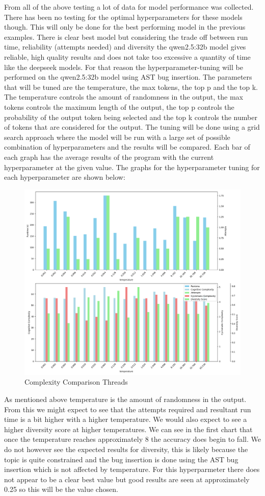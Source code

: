 \documentclass[12pt]{extarticle}
\begin{document}
From all of the above testing a lot of data for model performance was collected. There has been no testing for the optimal hyperparameters for these models though. This will only be done for the best performing model in the previous examples. There is clear best model but considering the trade off between run time, reliability (attempts needed) and diversity the qwen2.5:32b model gives reliable, high quality results and does not take too excessive a quantity of time like the deepseek models. For that reason the hyperparameter-tuning will be performed on the qwen2.5:32b model using AST bug insertion. The parameters that will be tuned are the temperature, the max tokens, the top p and the top k. The temperature controls the amount of randomness in the output, the max tokens controls the maximum length of the output, the top p controls the probability of the output token being selected and the top k controls the number of tokens that are considered for the output. The tuning will be done using a grid search approach where the model will be run with a large set of possible combination of hyperparameters and the results will be compared. Each bar of each graph has the average results of the program with the current hyperparameter at the given value. The graphs for the hyperparameter tuning for each hyperparameter are shown below:

\begin{figure}[h!]
\centering
\includegraphics[width=0.8\linewidth]{Images/Hyperparam_temperature_Comparison.png}
\caption{Complexity Comparison Threads}
\label{fig:Complexity_Comparison_Threads}
\end{figure}

As mentioned above temperature is the amount of randomness in the output. From this we might expect to see that the attempts required and resultant run time is a bit higher with a higher temperature. We would also expect to see a higher diversity score at higher temperatures. We can see in the first chart that once the temperature reaches approximately 8 the accuracy does begin to fall. We do not however see the expected results for diversity, this is likely because the topic is quite constrained and the bug insertion is done using the AST bug insertion which is not affected by temperature. For this hyperparmeter there does not appear to be a clear best value but good results are seen at approximately 0.25 so this will be the value chosen.
\end{document}
